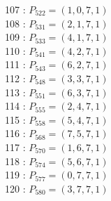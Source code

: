 \documentclass{article}
\begin{document}
{\begin{multicols}{3}
107 : $P_{522}=( 1, 0, 7, 1 )$\\
108 : $P_{531}=( 2, 1, 7, 1 )$\\
109 : $P_{533}=( 4, 1, 7, 1 )$\\
110 : $P_{541}=( 4, 2, 7, 1 )$\\
111 : $P_{543}=( 6, 2, 7, 1 )$\\
112 : $P_{548}=( 3, 3, 7, 1 )$\\
113 : $P_{551}=( 6, 3, 7, 1 )$\\
114 : $P_{555}=( 2, 4, 7, 1 )$\\
115 : $P_{558}=( 5, 4, 7, 1 )$\\
116 : $P_{568}=( 7, 5, 7, 1 )$\\
117 : $P_{570}=( 1, 6, 7, 1 )$\\
118 : $P_{574}=( 5, 6, 7, 1 )$\\
119 : $P_{577}=( 0, 7, 7, 1 )$\\
120 : $P_{580}=( 3, 7, 7, 1 )$\\
\end{multicols}


%


%


}%
\end{document}
